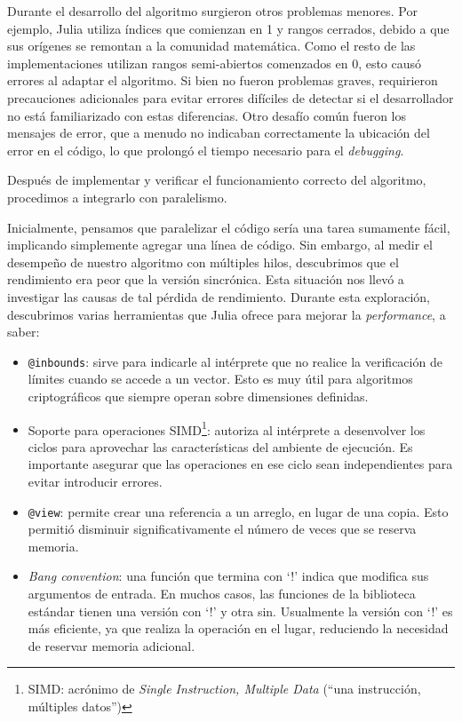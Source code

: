 \documentclass[11pt]{article}
\newcommand{\english}[1]{\textit{#1}}
\begin{document}
Durante el desarrollo del algoritmo surgieron otros problemas menores. Por ejemplo, Julia utiliza índices que comienzan en 1 y rangos cerrados, debido a que sus orígenes se remontan a la comunidad matemática. Como el resto de las implementaciones utilizan rangos semi-abiertos comenzados en 0, esto causó errores al adaptar el algoritmo. Si bien no fueron problemas graves, requirieron precauciones adicionales para evitar errores difíciles de detectar si el desarrollador no está familiarizado con estas diferencias. Otro desafío común fueron los mensajes de error, que a menudo no indicaban correctamente la ubicación del error en el código, lo que prolongó el tiempo necesario para el \english{debugging}.

Después de implementar y verificar el funcionamiento correcto del algoritmo, procedimos a integrarlo con paralelismo.

Inicialmente, pensamos que paralelizar el código sería una tarea sumamente fácil, implicando simplemente agregar una línea de código. Sin embargo, al medir el desempeño de nuestro algoritmo con múltiples hilos, descubrimos que el rendimiento era peor que la versión sincrónica. Esta situación nos llevó a investigar las causas de tal pérdida de rendimiento. Durante esta exploración, descubrimos varias herramientas que Julia ofrece para mejorar la \english{performance}, a saber:

\begin{itemize}
    \item \lstinline{@inbounds}: sirve para indicarle al intérprete que no realice la verificación de límites cuando se accede a un vector. Esto es muy útil para algoritmos criptográficos que siempre operan sobre dimensiones definidas.
    \item Soporte para operaciones SIMD\footnote{SIMD: acrónimo de \english{Single Instruction, Multiple Data} (``una instrucción, múltiples datos'')}: autoriza al intérprete a desenvolver los ciclos para aprovechar las características del ambiente de ejecución. Es importante asegurar que las operaciones en ese ciclo sean independientes para evitar introducir errores.
    \item \lstinline{@view}: permite crear una referencia a un arreglo, en lugar de una copia. Esto permitió disminuir significativamente el número de veces que se reserva memoria.
    \item \english{Bang convention}: una función que termina con `!' indica que modifica sus argumentos de entrada. En muchos casos, las funciones de la biblioteca estándar tienen una versión con `!' y otra sin. Usualmente la versión con `!' es más eficiente, ya que realiza la operación en el lugar, reduciendo la necesidad de reservar memoria adicional.
\end{itemize}
\end{document}
